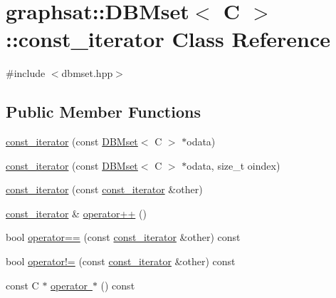 \hypertarget{classgraphsat_1_1_d_b_mset_1_1const__iterator}{}\section{graphsat\+::D\+B\+Mset$<$ C $>$\+::const\+\_\+iterator Class Reference}
\label{classgraphsat_1_1_d_b_mset_1_1const__iterator}


{\ttfamily \#include $<$dbmset.\+hpp$>$}

\subsection*{Public Member Functions}
\begin{DoxyCompactItemize}
\item 
\mbox{\hyperlink{classgraphsat_1_1_d_b_mset_1_1const__iterator_acc4063dc1e5ba8bbeddfc5814dc3a417}{const\+\_\+iterator}} (const \mbox{\hyperlink{classgraphsat_1_1_d_b_mset}{D\+B\+Mset}}$<$ C $>$ $\ast$odata)
\item 
\mbox{\hyperlink{classgraphsat_1_1_d_b_mset_1_1const__iterator_a5b9226c674cdc018deeb7665b0415442}{const\+\_\+iterator}} (const \mbox{\hyperlink{classgraphsat_1_1_d_b_mset}{D\+B\+Mset}}$<$ C $>$ $\ast$odata, size\+\_\+t oindex)
\item 
\mbox{\hyperlink{classgraphsat_1_1_d_b_mset_1_1const__iterator_a0d6c9b46deafd694547a4b047a9fe371}{const\+\_\+iterator}} (const \mbox{\hyperlink{classgraphsat_1_1_d_b_mset_1_1const__iterator}{const\+\_\+iterator}} \&other)
\item 
\mbox{\hyperlink{classgraphsat_1_1_d_b_mset_1_1const__iterator}{const\+\_\+iterator}} \& \mbox{\hyperlink{classgraphsat_1_1_d_b_mset_1_1const__iterator_a3149acd6dd23d7ddcb28785b5682c68a}{operator++}} ()
\item 
bool \mbox{\hyperlink{classgraphsat_1_1_d_b_mset_1_1const__iterator_a70e7e14a5fec648ccbce4e8cfc7ead03}{operator==}} (const \mbox{\hyperlink{classgraphsat_1_1_d_b_mset_1_1const__iterator}{const\+\_\+iterator}} \&other) const
\item 
bool \mbox{\hyperlink{classgraphsat_1_1_d_b_mset_1_1const__iterator_adda5b4d34e61f8c9bb053729ee028c45}{operator!=}} (const \mbox{\hyperlink{classgraphsat_1_1_d_b_mset_1_1const__iterator}{const\+\_\+iterator}} \&other) const
\item 
const C $\ast$ \mbox{\hyperlink{classgraphsat_1_1_d_b_mset_1_1const__iterator_acbf30d7be409b9b4806fd0594eaf95be}{operator $\ast$}} () const
\end{DoxyCompactItemize}
